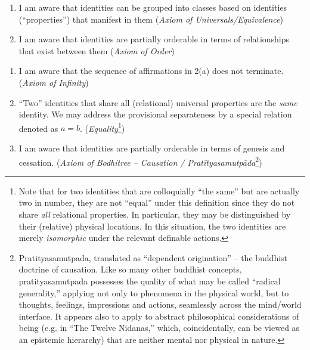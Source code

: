 \documentclass[pra,twocolumn,groupedaddress,10pt]{revtex4}
\theoremstyle{definition}
\begin{document}
\begin{enumerate}[label={[\textbf{\arabic*}]},start=0]
\begin {enumerate}
			\item I am aware that identities can be grouped into classes based on identities (``properties'') that manifest in them (\emph{Axiom of Universals/Equivalence})
			\item I am aware that identities are partially orderable in terms of relationships that exist between them (\emph{Axiom of Order})
		\end{enumerate}
	\item \begin{enumerate}
			\item I am aware that the sequence of affirmations in 2(a) does not terminate. (\emph{Axiom of Infinity})
			\item ``Two'' identities that share all (relational) universal properties are the \emph{same} identity. We may address the provisional separateness by a special relation denoted as $a = b$. (\emph{Equality}\footnote{Note that for two identities that are colloquially ``the same'' but are actually two in number, they are not ``equal'' under this definition since they do not share \emph{all} relational properties. In particular, they may be distinguished by their (relative) physical locations. In this situation, the two identities are merely \emph{isomorphic} under the relevant definable actions.})
			\item I am aware that identities are partially orderable in terms of genesis and cessation. (\emph{Axiom of Bodhitree -- Causation / Prat\={i}tyasamutp\={a}da}\footnote{Pratityasamutpada, translated as ``dependent origination'' -- the buddhist doctrine of causation. Like so many other buddhist concepts, pratityasamutpada possesses the quality of what may be called ``radical generality,'' applying not only to phenomena in the physical world, but to thoughts, feelings, impressions and actions, seamlessly across the mind/world interface. It appears also to apply to abstract philosophical considerations of being (e.g. in ``The Twelve Nidanas,'' which, coincidentally, can be viewed as an epistemic hierarchy) that are neither mental nor physical in nature.})

\end{enumerate}
\end{enumerate}
\end{document}
